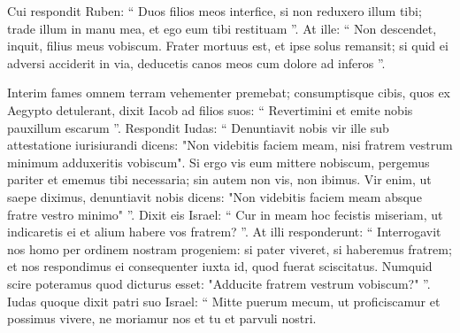 \begin{biblechapter}
\begin{biblechapter}
\begin{biblechapter}
\begin{biblechapter}
\begin{biblechapter}
\begin{biblechapter}
\begin{biblechapter}
\begin{biblechapter}
\begin{biblechapter}
\begin{biblechapter}
\begin{biblechapter}
\begin{biblechapter}
\begin{biblechapter}
\begin{biblechapter}
\begin{biblechapter}
\begin{biblechapter}
\begin{biblechapter}
\begin{biblechapter}
\begin{biblechapter}
\begin{biblechapter}
\begin{biblechapter}
\begin{biblechapter}
\begin{biblechapter}
\begin{biblechapter}
\begin{biblechapter}
\begin{biblechapter}
\begin{biblechapter}
\begin{biblechapter}
\begin{biblechapter}
\begin{biblechapter}
\begin{biblechapter}
\begin{biblechapter}
\begin{biblechapter}
\begin{biblechapter}
\begin{biblechapter}
\begin{biblechapter}
\begin{biblechapter}
\begin{biblechapter}
\begin{biblechapter}
\begin{biblechapter}
\begin{biblechapter}
\begin{biblechapter}
\verse Cui respondit Ruben: “ Duos filios meos interfice, si non reduxero illum tibi; trade illum in manu mea, et ego eum tibi restituam ”. 
\verse At ille: “ Non descendet, inquit, filius meus vobiscum. Frater mortuus est, et ipse solus remansit; si quid ei adversi acciderit in via, deducetis canos meos cum dolore ad inferos ”.
 
\begin{biblechapter}
\verse Interim fames omnem terram vehementer premebat; 
\verse consumptisque cibis, quos ex Aegypto detulerant, dixit Iacob ad filios suos: “ Revertimini et emite nobis pauxillum escarum ”. 
\verse Respondit Iudas: “ Denuntiavit nobis vir ille sub attestatione iurisiurandi dicens: "Non videbitis faciem meam, nisi fratrem vestrum minimum adduxeritis vobiscum". 
\verse Si ergo vis eum mittere nobiscum, pergemus pariter et ememus tibi necessaria; 
\verse sin autem non vis, non ibimus. Vir enim, ut saepe diximus, denuntiavit nobis dicens: "Non videbitis faciem meam absque fratre vestro minimo" ”.
 \verse Dixit eis Israel: “ Cur in meam hoc fecistis miseriam, ut indicaretis ei et alium habere vos fratrem? ”. 
\verse At illi responderunt: “ Interrogavit nos homo per ordinem nostram progeniem: si pater viveret, si haberemus fratrem; et nos respondimus ei consequenter iuxta id, quod fuerat sciscitatus. Numquid scire poteramus quod dicturus esset: "Adducite fratrem vestrum vobiscum?" ”.
 \verse Iudas quoque dixit patri suo Israel: “ Mitte puerum mecum, ut proficiscamur et possimus vivere, ne moriamur nos et tu et parvuli nostri. 

\end{biblechapter}
\end{biblechapter}
\end{biblechapter}
\end{biblechapter}
\end{biblechapter}
\end{biblechapter}
\end{biblechapter}
\end{biblechapter}
\end{biblechapter}
\end{biblechapter}
\end{biblechapter}
\end{biblechapter}
\end{biblechapter}
\end{biblechapter}
\end{biblechapter}
\end{biblechapter}
\end{biblechapter}
\end{biblechapter}
\end{biblechapter}
\end{biblechapter}
\end{biblechapter}
\end{biblechapter}
\end{biblechapter}
\end{biblechapter}
\end{biblechapter}
\end{biblechapter}
\end{biblechapter}
\end{biblechapter}
\end{biblechapter}
\end{biblechapter}
\end{biblechapter}
\end{biblechapter}
\end{biblechapter}
\end{biblechapter}
\end{biblechapter}
\end{biblechapter}
\end{biblechapter}
\end{biblechapter}
\end{biblechapter}
\end{biblechapter}
\end{biblechapter}
\end{biblechapter}
\end{biblechapter}
